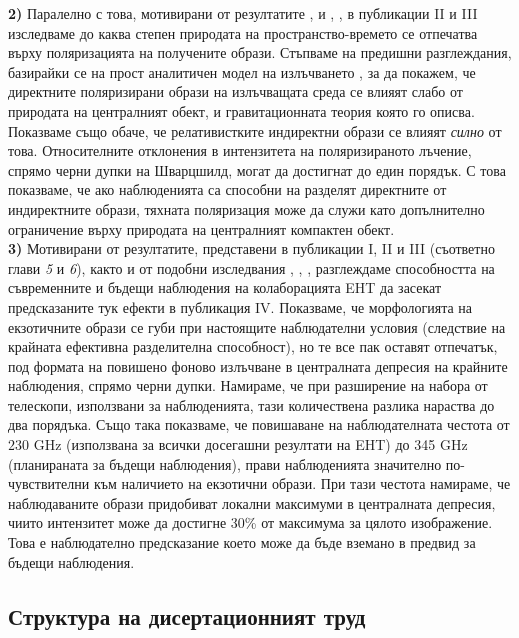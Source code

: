 \textbf{2)} Паралелно с това, мотивирани от резултатите \cite{EHT_M87_VII}, \cite{EHT_M87_VIII} и \cite{EHT_SGR_VII}, \cite{EHT_SGR_VIII}, в публикации II и III изследваме до каква степен природата на пространство-времето се отпечатва върху поляризацията на получените образи. Стъпваме на предишни разглеждания, базирайки се на прост аналитичен модел на излъчването \cite{Narayan2021} \cite{Gelles2021}, за да покажем, че директните поляризирани образи на излъчващата среда се влияят слабо от природата на централният обект, и гравитационната теория която го описва. Показваме също обаче, че релативистките индиректни образи се влияят \emph{силно} от това. Относителните отклонения в интензитета на поляризираното лъчение, спрямо черни дупки на Шварцшилд, могат да достигнат до един порядък. С това показваме, че ако наблюденията са способни на разделят директните от индиректните образи, тяхната поляризация може да служи като допълнително ограничение върху природата на централният компактен обект.\\

\textbf{3)} Мотивирани от резултатите, представени в публикации I, II и III (съответно глави \emph{5} и \emph{6}), както и от подобни изследвания \cite{Eichhorn2022}, \cite{Qin2021}, \cite{Geometric_Modeling}, разглеждаме способността на съвременните и бъдещи наблюдения на колаборацията EHT да засекат предсказаните тук ефекти в публикация IV. Показваме, че морфологията на екзотичните образи се губи при настоящите наблюдателни условия (следствие на крайната ефективна разделителна способност), но те все пак оставят отпечатък, под формата на повишено фоново излъчване в централната депресия на крайните наблюдения, спрямо черни дупки. Намираме, че при разширение на набора от телескопи, използвани за наблюденията, тази количествена разлика нараства до два порядъка. Също така показваме, че повишаване на наблюдателната честота от $230$ GHz (използвана за всички досегашни резултати на EHT) до 345 GHz (планираната за бъдещи наблюдения), прави наблюденията значително по-чувствителни към наличието на екзотични образи. При тази честота намираме, че наблюдаваните образи придобиват локални максимуми в централната депресия, чиито интензитет може да достигне 30\% от максимума за цялото изображение. Това е наблюдателно предсказание което може да бъде вземано в предвид за бъдещи наблюдения.

\subsection{Структура на дисертационният труд}

